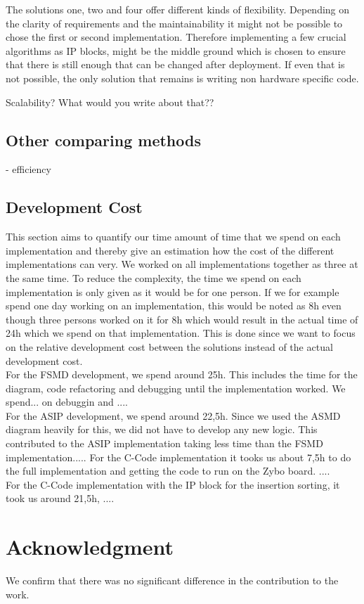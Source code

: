 \documentclass[conference]{IEEEtran}
\begin{document}
The solutions one, two and four offer different kinds of flexibility. Depending on the clarity of requirements and the maintainability it might not be possible to chose the first or second implementation. Therefore implementing a few crucial algorithms as IP blocks, might be the middle ground which is chosen to ensure that there is still enough that can be changed after deployment. If even that is not possible, the only solution that remains is writing non hardware specific code.

Scalability? What would you write about that??

\subsection{Other comparing methods}
- efficiency

\subsection{Development Cost}
This section aims to quantify our time amount of time that we spend on each implementation and thereby give an estimation how the cost of the different implementations can very. We worked on all implementations together as three at the same time. To reduce the complexity, the time we spend on each implementation is only given as it would be for one person. If we for example spend one day working on an implementation, this would be noted as 8h even though three persons worked on it for 8h which would result in the actual time of 24h which we spend on that implementation. This is done since we want to focus on the relative development cost between the solutions instead of the actual development cost.\\
For the FSMD development, we spend around 25h. This includes the time for the diagram, code refactoring and debugging until the implementation worked. We spend... on debuggin and .... \\
For the ASIP development, we spend around 22,5h. Since we used the ASMD diagram heavily for this, we did not have to develop any new logic. This contributed to the ASIP implementation taking less time than the FSMD implementation.....
For the C-Code implementation it tooks us about 7,5h to do the full implementation and getting the code to run on the Zybo board. ....\\
For the C-Code implementation with the IP block for the insertion sorting, it took us around 21,5h, .... \\

\section*{Acknowledgment}

We confirm that there was no significant difference in the contribution to the work.

\printbibliography
\end{document}
